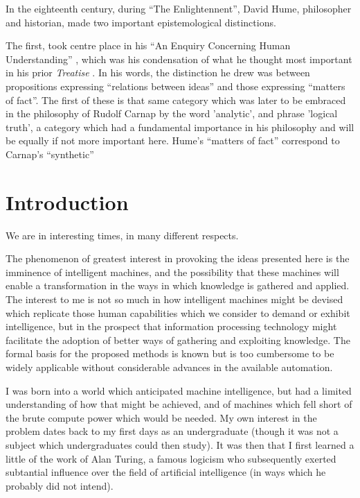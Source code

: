 \documentclass[10pt,titlepage]{book}
\begin{document}
In the eighteenth century, during ``The Enlightennent'', David Hume, philosopher and historian, made two important epistemological distinctions.

The first, took centre place in his ``An Enquiry Concerning Human Understanding'' \cite{hume48}, which was his condensation of what he thought most important in his prior \emph{Treatise} \cite{hume39}.
In his words, the distinction he drew was between propositions expressing ``relations between ideas'' and those expressing ``matters of fact''.
The first of these is that same category which was later to be embraced in the philosophy of Rudolf Carnap by the word 'analytic', and phrase 'logical truth', a category which had a fundamental importance in his philosophy and will be equally if not more important here.
Hume's ``matters of fact'' correspond to Carnap's ``synthetic'' 










\chapter{Introduction}

We are in interesting times, in many different respects.

The phenomenon of greatest interest in provoking the ideas presented here is the imminence of intelligent machines, and the possibility that these machines will enable a transformation in the ways in which knowledge is gathered and applied.
The interest to me is not so much in how intelligent machines might be devised which replicate those human capabilities which we consider to demand or exhibit intelligence, but in the prospect that information processing technology might facilitate the adoption of better ways of gathering and exploiting knowledge.
The formal basis for the proposed methods is known but is too cumbersome to be widely applicable without considerable advances in the available automation.

I was born into a world which anticipated machine intelligence, but had a limited understanding of how that might be achieved, and of machines which fell short of the brute compute power which would be needed. 
My own interest in the problem dates back to my first days as an undergraduate (though it was not a subject which undergraduates could then study).
It was then that I first learned a little of the work of Alan Turing, a famous logicism who subsequently exerted subtantial influence over the field of artificial intelligence (in ways which he probably did not intend).
\end{document}
